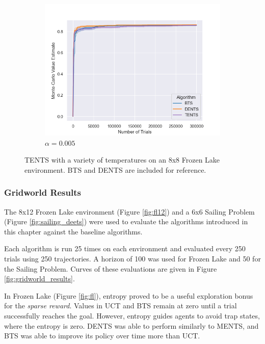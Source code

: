 \begin{figure}
\begin{subfigure}[b]{0.32\textwidth}
                    \centering
                    \includegraphics[width=\textwidth]{figures/temp/fl_sens/058_fl8_0_005_03.png}
                    \caption{$\alpha=0.005$}
                \end{subfigure}
                
                \caption{TENTS with a variety of temperatures on an 8x8 Frozen Lake environment. BTS and DENTS are included for reference. }
                \label{fig:fl_param_sens_tents}
            \end{figure}



        \subsubsection{Gridworld Results}


            The 8x12 Frozen Lake environment (Figure \ref{fig:fl12}) and a 6x6 Sailing Problem (Figure \ref{fig:sailing_deets}) were used to evaluate the algorithms introduced in this chapter against the baseline algorithms.

            Each algorithm is run 25 times on each environment and evaluated every 250 trials using 250 trajectories. 
            A horizon of 100 was used for Frozen Lake and 50 for the Sailing Problem. Curves of these evaluations are given in Figure \ref{fig:gridworld_results}.

            In Frozen Lake (Figure \ref{fig:fl}), entropy proved to be a useful exploration bonus for the \textit{sparse reward}. Values in UCT and BTS remain at zero until a trial successfully reaches the goal. However, entropy guides agents to avoid trap states, where the entropy is zero. DENTS was able to perform similarly to MENTS, and BTS was able to improve its policy over time more than UCT.

